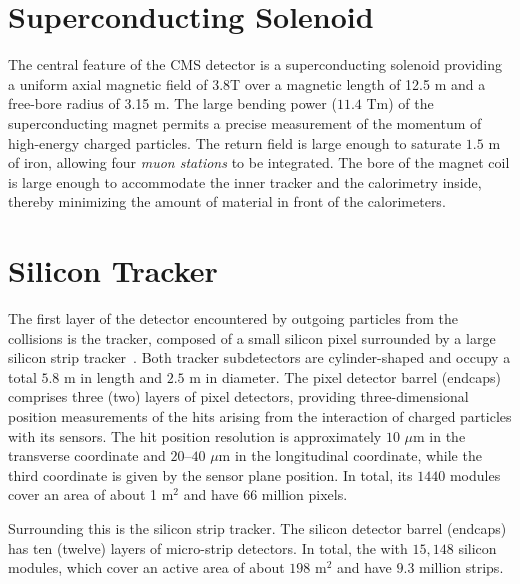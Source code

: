 \section{Superconducting Solenoid}
\label{sec:magnet}
The central feature of the CMS detector is a
superconducting solenoid providing a uniform axial
magnetic field of 3.8\unit{T}  over a magnetic length of 12.5 \unit{m}
and a free-bore radius of 3.15 \unit{m}. The large bending power ($11.4$ \unit{T}\unit{m}) of the
superconducting magnet permits a precise measurement of the momentum
of high-energy charged particles. The return field is large enough to
saturate $1.5$ \unit{m} of iron, allowing four \emph{muon stations} to be
integrated.
The bore of the magnet coil is large enough to accommodate the inner tracker
and the calorimetry inside, thereby minimizing the amount of material
in front of the calorimeters.

\section{Silicon Tracker}
\label{sec:tracker}
The first layer of the detector encountered by outgoing particles from the
collisions is the tracker, composed of a small silicon pixel
surrounded by a large silicon strip tracker~\cite{Chatrchyan:2014fea}. Both tracker subdetectors are
cylinder-shaped and occupy a total $5.8$ \unit{m} in length and $2.5$
\unit{m} in diameter. The pixel detector barrel (endcaps) comprises three (two) layers of pixel
detectors, providing three-dimensional position measurements of the
hits arising from the interaction of charged particles with its
sensors. The hit position resolution is approximately $10$ $\mu$m in
the transverse coordinate and $20–40$ $\mu$m in the longitudinal
coordinate, while the third coordinate is given by the sensor plane
position. In total, its $1440$ modules cover an area of about 1
m$^{2}$ and have $66$ million pixels.


Surrounding this is the silicon strip tracker. The silicon detector
barrel (endcaps) has ten (twelve) layers of micro-strip detectors. In
total, the with
$15,148$ silicon modules, which cover an active area of about $198$
m$^2$ and have $9.3$ million strips. 

